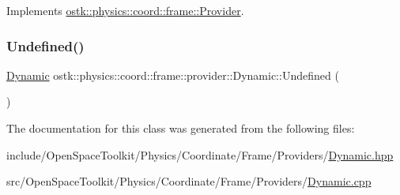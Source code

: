 Implements \hyperlink{classostk_1_1physics_1_1coord_1_1frame_1_1_provider_a27acab0012649796b97956fed1a91493}{ostk\+::physics\+::coord\+::frame\+::\+Provider}.

\mbox{\label{classostk_1_1physics_1_1coord_1_1frame_1_1provider_1_1_dynamic_aee37346f8f67c537c87c490ecf48238c}} 
\subsubsection{\texorpdfstring{Undefined()}{Undefined()}}
{\footnotesize\ttfamily \hyperlink{classostk_1_1physics_1_1coord_1_1frame_1_1provider_1_1_dynamic}{Dynamic} ostk\+::physics\+::coord\+::frame\+::provider\+::\+Dynamic\+::\+Undefined (\begin{DoxyParamCaption}{ }\end{DoxyParamCaption})\hspace{0.3cm}{\ttfamily [static]}}



The documentation for this class was generated from the following files\+:\begin{DoxyCompactItemize}
\item 
include/\+Open\+Space\+Toolkit/\+Physics/\+Coordinate/\+Frame/\+Providers/\hyperlink{_dynamic_8hpp}{Dynamic.\+hpp}\item 
src/\+Open\+Space\+Toolkit/\+Physics/\+Coordinate/\+Frame/\+Providers/\hyperlink{_dynamic_8cpp}{Dynamic.\+cpp}\end{DoxyCompactItemize}
